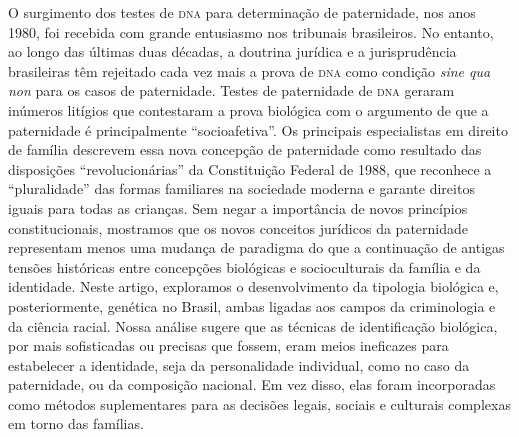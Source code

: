 \documentclass{article}
\begin{document}
O surgimento dos testes de \textsc{dna} para determinação de paternidade, nos anos 1980,
foi recebida com grande entusiasmo nos tribunais brasileiros. No entanto, ao
longo das últimas duas décadas, a doutrina jurídica e a jurisprudência
brasileiras têm rejeitado cada vez mais a prova de \textsc{dna} como condição
\textit{sine qua non}
para os casos de paternidade. Testes de paternidade de \textsc{dna} geraram inúmeros
litígios que contestaram a prova biológica com o argumento de que a paternidade
é principalmente “socioafetiva”. Os principais especialistas em direito de
família descrevem essa nova concepção de paternidade como resultado das
disposições “revolucionárias” da Constituição Federal de 1988, que reconhece a
“pluralidade” das formas familiares na sociedade moderna e garante direitos
iguais para todas as crianças. Sem negar a importância de novos princípios
constitucionais, mostramos que os novos conceitos jurídicos da paternidade
representam menos uma mudança de paradigma do que a continuação de antigas
tensões históricas entre concepções biológicas e socioculturais da família e da
identidade. Neste artigo, exploramos o desenvolvimento da tipologia biológica e,
posteriormente, genética no Brasil, ambas ligadas aos campos da criminologia e
da ciência racial. Nossa análise sugere que as técnicas de identificação
biológica, por mais sofisticadas ou precisas que fossem, eram meios ineficazes
para estabelecer a identidade, seja da personalidade individual, como no caso da
paternidade, ou da composição nacional. Em vez disso, elas foram incorporadas
como métodos suplementares para as decisões legais, sociais e culturais
complexas em torno das famílias.
\end{document}
